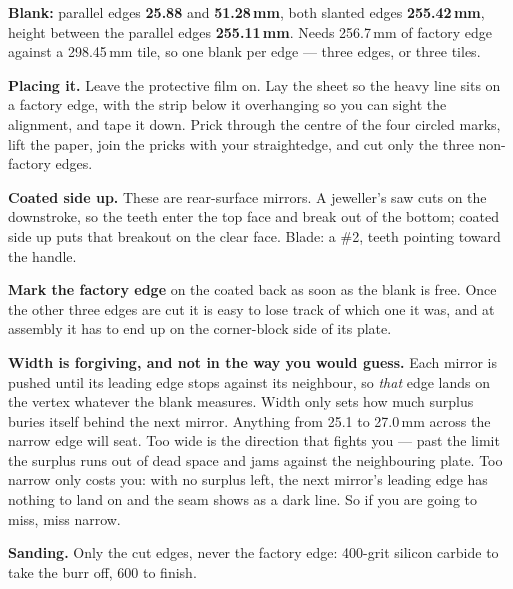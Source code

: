 \documentclass[letterpaper,10pt]{article}
\begin{document}
{\footnotesize
\textbf{Blank:} parallel edges \textbf{25.88} and \textbf{51.28\,mm}, both slanted edges \textbf{255.42\,mm}, height between the parallel edges \textbf{255.11\,mm}. Needs 256.7\,mm of factory edge against a 298.45\,mm tile, so one blank per edge --- three edges, or three tiles.

\smallskip

\textbf{Placing it.} Leave the protective film on. Lay the sheet so the heavy line sits on
a factory edge, with the strip below it overhanging so you can sight the alignment, and tape
it down. Prick through the centre of the four circled marks, lift the paper, join the pricks
with your straightedge, and cut only the three non-factory edges.

\smallskip

\textbf{Coated side up.} These are rear-surface mirrors. A jeweller's saw cuts on the
downstroke, so the teeth enter the top face and break out of the bottom; coated side up puts
that breakout on the clear face. Blade: a \#2, teeth pointing toward the handle.

\smallskip

\textbf{Mark the factory edge} on the coated back as soon as the blank is free. Once the
other three edges are cut it is easy to lose track of which one it was, and at assembly it
has to end up on the corner-block side of its plate.

\smallskip

\textbf{Width is forgiving, and not in the way you would guess.} Each mirror is pushed until
its leading edge stops against its neighbour, so \emph{that} edge lands on the vertex whatever
the blank measures. Width only sets how much surplus buries itself behind the next mirror.
Anything from 25.1 to 27.0\,mm across the narrow edge will seat. Too wide is the direction that fights you --- past
the limit the surplus runs out of dead space and jams against the neighbouring plate. Too narrow
only costs you: with no surplus left, the next mirror's leading edge has nothing to land on and
the seam shows as a dark line. So if you are going to miss, miss narrow.

\smallskip

\textbf{Sanding.} Only the cut edges, never the factory edge: 400-grit silicon carbide to take
the burr off, 600 to finish.
}
\end{document}
